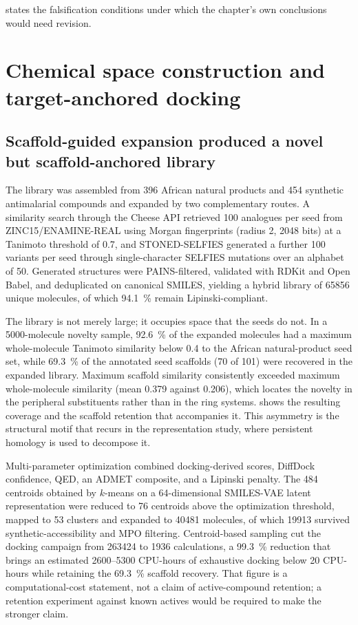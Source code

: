 states the falsification conditions under which the chapter's own conclusions would need revision.

\section{Chemical space construction and target-anchored docking}\label{sec:res_chemspace}

\subsection{Scaffold-guided expansion produced a novel but scaffold-anchored library}

The library was assembled from \num{396} African natural products and \num{454} synthetic antimalarial compounds and expanded by two complementary routes. A similarity search through the Cheese API retrieved \num{100} analogues per seed from ZINC15/ENAMINE-REAL using Morgan fingerprints (radius \num{2}, \num{2048} bits) at a Tanimoto threshold of \num{0.7}, and STONED-SELFIES generated a further \num{100} variants per seed through single-character SELFIES mutations over an alphabet of \num{50}. Generated structures were PAINS-filtered, validated with RDKit and Open Babel, and deduplicated on canonical SMILES, yielding a hybrid library of \num{65856} unique molecules, of which \qty{94.1}{\percent} remain Lipinski-compliant.

The library is not merely large; it occupies space that the seeds do not. In a \num{5000}-molecule novelty sample, \qty{92.6}{\percent} of the expanded molecules had a maximum whole-molecule Tanimoto similarity below \num{0.4} to the African natural-product seed set, while \qty{69.3}{\percent} of the annotated seed scaffolds (\num{70} of \num{101}) were recovered in the expanded library. Maximum scaffold similarity consistently exceeded maximum whole-molecule similarity (mean \num{0.379} against \num{0.206}), which locates the novelty in the peripheral substituents rather than in the ring systems.  shows the resulting coverage and the scaffold retention that accompanies it. This asymmetry is the structural motif that recurs in the representation study, where persistent homology is used to decompose it.

Multi-parameter optimization combined docking-derived scores, DiffDock confidence, QED, an ADMET composite, and a Lipinski penalty. The \num{484} centroids obtained by $k$-means on a \num{64}-dimensional SMILES-VAE latent representation were reduced to \num{76} centroids above the optimization threshold, mapped to \num{53} clusters and expanded to \num{40481} molecules, of which \num{19913} survived synthetic-accessibility and MPO filtering. Centroid-based sampling cut the docking campaign from \num{263424} to \num{1936} calculations, a \qty{99.3}{\percent} reduction that brings an estimated \numrange{2600}{5300} CPU-hours of exhaustive docking below \num{20} CPU-hours while retaining the \qty{69.3}{\percent} scaffold recovery. That figure is a computational-cost statement, not a claim of active-compound retention; a retention experiment against known actives would be required to make the stronger claim.

